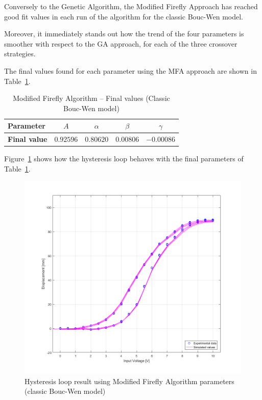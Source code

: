 Conversely to the Genetic Algorithm, the Modified Firefly Approach
has reached good fit values in each run of the algorithm for the classic Bouc-Wen model.

Moreover, it immediately stands out how the trend of the four parameters
is smoother with respect to the GA approach, for each of the three crossover strategies.

The final values found for each parameter using the MFA approach are shown
in Table~\ref{tab:mfa_final_classic}.

\begin{table}[H]
	\centering
	\begin{tabular}{l c c c c}
		\toprule
		\textbf{Parameter}		& $A$	& $\alpha$	& $\beta$	& $\gamma$ 	\\ \midrule
		\textbf{Final value}	& $0.92596$	& $0.80620$	& $0.00806$ & $-0.00086$ \\
		\bottomrule
	\end{tabular}
	\caption{Modified Firefly Algorithm -- Final values (Classic Bouc-Wen model)}
	\label{tab:mfa_final_classic}
\end{table}

Figure~\ref{fig:mfa_classic_hys} shows how the hysteresis loop behaves
with the final parameters of Table~\ref{tab:mfa_final_classic}.

\begin{figure}[H]
	\centering
	\includegraphics[width=\linewidth]{Images/mfa_prop_final}
	\caption{Hysteresis loop result using Modified Firefly Algorithm parameters (classic Bouc-Wen model)}
	\label{fig:mfa_classic_hys}
\end{figure}

